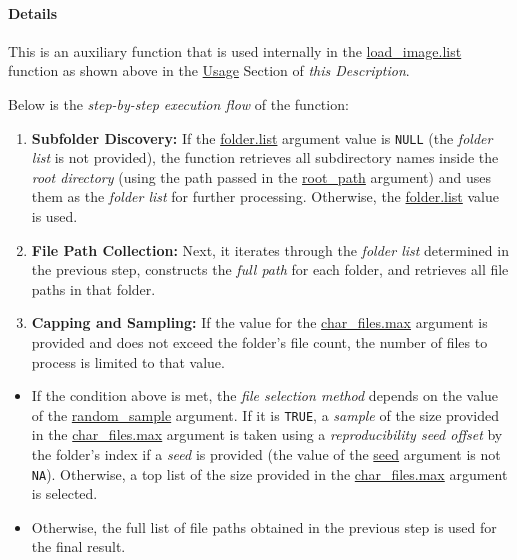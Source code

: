 \documentclass[
]{report}
\providecommand{\tightlist}{%
  \setlength{\itemsep}{0pt}\setlength{\parskip}{0pt}}
\begin{document}
\protect{}\label{func.img.file.get_list.details}
\paragraph{Details}\label{details-2}

\hfill\break

This is an auxiliary function that is used internally in the \hyperref[func.load_image.list]{load\_image.list} function as shown above in the \hyperref[func.img.file.get_list.usage]{Usage} Section of \emph{this Description}.

Below is the \emph{step-by-step execution flow} of the function:

\begin{enumerate}
\def\labelenumi{\arabic{enumi}.}
\tightlist
\item
  \textbf{Subfolder Discovery:} If the \hyperref[func.img.file.get_list.args.folder.list]{folder.list} argument value is \texttt{NULL} (the \emph{folder list} is not provided), the function retrieves all subdirectory names inside the \emph{root directory} (using the path passed in the \hyperref[func.img.file.get_list.args.root_path]{root\_path} argument) and uses them as the \emph{folder list} for further processing. Otherwise, the \hyperref[func.img.file.get_list.args.folder.list]{folder.list} value is used.
\item
  \textbf{File Path Collection:} Next, it iterates through the \emph{folder list} determined in the previous step, constructs the \emph{full path} for each folder, and retrieves all file paths in that folder.
\item
  \textbf{Capping and Sampling:} If the value for the \hyperref[func.img.file.get_list.args.char_files.max]{char\_files.max} argument is provided and does not exceed the folder's file count, the number of files to process is limited to that value.
\end{enumerate}

\begin{noteblock}

\begin{itemize}
\tightlist
\item
  If the condition above is met, the \emph{file selection method} depends on the value of the \hyperref[func.img.file.get_list.args.random_sample]{random\_sample} argument. If it is \texttt{TRUE}, a \emph{sample} of the size provided in the \hyperref[func.img.file.get_list.args.char_files.max]{char\_files.max} argument is taken using a \emph{reproducibility seed offset} by the folder's index if a \emph{seed} is provided (the value of the \hyperref[func.img.file.get_list.args.seed]{seed} argument is not \texttt{NA}). Otherwise, a top list of the size provided in the \hyperref[func.img.file.get_list.args.char_files.max]{char\_files.max} argument is selected.
\item
  Otherwise, the full list of file paths obtained in the previous step is used for the final result.
\end{itemize}

\end{noteblock}
\end{document}
